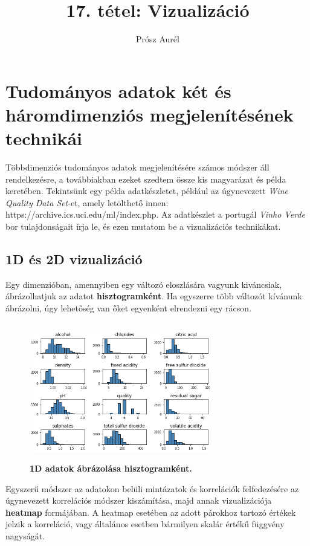 \documentclass[12pt]{article}
\theoremstyle{plain}
\begin{document}
\title{17. tétel: Vizualizáció}
\author{Prósz Aurél}

\maketitle


\newpage
\section{Tudományos adatok két és háromdimenziós megjelenítésének technikái}
Többdimenziós tudományos adatok megjelenítésére számos módszer áll rendelkezésre, a továbbiakban ezeket szedtem össze kis magyarázat és példa keretében. \newline
Tekintsünk egy példa adatkészletet, például az úgynevezett \textit{Wine Quality Data Set}-et, amely letölthető innen:  https://archive.ics.uci.edu/ml/index.php. Az adatkészlet a portugál \textit{Vinho Verde} bor tulajdonságait írja le, és ezen mutatom be a vizualizációs technikákat. 


\subsection{1D és 2D vizualizáció}
Egy dimenzióban, amennyiben egy változó eloszlására vagyunk kiváncsiak, ábrázolhatjuk az adatot \textbf{hisztogramként}. Ha egyszerre több változót kívánunk ábrázolni, úgy lehetőség van őket egyenként elrendezni egy rácson. 

\begin{figure}[H]
    \centering
    \includegraphics[width=8cm, height=6cm]{media/hist.png}
    \caption{\textbf{1D adatok ábrázolása hisztogramként.}}
    \label{fig:GeneralDiagram}
 \end{figure}
 
 Egyszerű módszer az adatokon belüli mintázatok és korrelációk felfedezésére az úgynevezett korrelációs módszer kiszámítása, majd annak vizualizációja \textbf{heatmap} formájában. A heatmap esetében az adott párokhoz tartozó értékek jelzik a korreláció, vagy általános esetben bármilyen skalár értékű függvény nagyságát.
 
\end{document}
